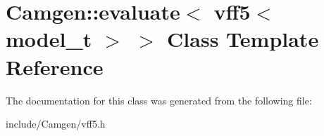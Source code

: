 \hypertarget{a00201}{\section{Camgen\-:\-:evaluate$<$ vff5$<$ model\-\_\-t $>$ $>$ Class Template Reference}
\label{a00201}
}


The documentation for this class was generated from the following file\-:\begin{DoxyCompactItemize}
\item 
include/\-Camgen/vff5.\-h\end{DoxyCompactItemize}
